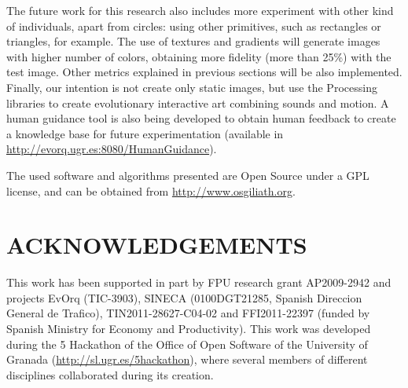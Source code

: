 \documentclass[a4paper,twoside]{article}
\begin{document}
The future work for this research also includes more experiment with other kind of individuals, apart from circles: using other primitives, such as rectangles or triangles, for example. The use of textures and gradients will generate images with higher number of colors, obtaining more fidelity (more than 25\%) with the test image. Other metrics explained in previous sections will be also implemented. Finally, our intention is not create only static images, but use the Processing libraries to create evolutionary interactive art combining sounds and motion. A human guidance tool is also being developed to obtain human feedback to create a knowledge base for future experimentation (available in \url{http://evorq.ugr.es:8080/HumanGuidance}).

The used software and algorithms presented are Open Source under a GPL license, and can be obtained from \url{http://www.osgiliath.org}.

\section*{\uppercase{acknowledgements}}
\noindent This work has been supported in part by FPU research grant AP2009-2942
and projects EvOrq (TIC-3903), SINECA (0100DGT21285, Spanish Direccion
General de Trafico), TIN2011-28627-C04-02 and FFI2011-22397 (funded by
Spanish Ministry for Economy and Productivity). This work was
developed during the 5 Hackathon of the Office of Open Software of the
University of Granada (\url{http://sl.ugr.es/5hackathon}), where
several members of different disciplines collaborated during its
creation. 

\vfill


\end{document}
